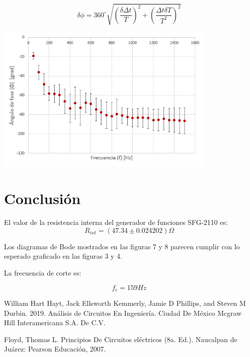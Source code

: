 \documentclass[DIV=calc, paper=a4, fontsize=11pt]{scrartcl}
\newenvironment{Figura}
  {\par\medskip\noindent\minipage{\linewidth}}
  {\endminipage\par\medskip}
\begin{document}
\begin{multicols}{2}
\begin{equation*}
     \delta \phi =360^{\circ} \sqrt{\left(\frac{\delta \Delta t}{T}\right)^2 + \left(\frac{\Delta t\delta T}{T^2}\right)^2}
\end{equation*}



\begin{Figura}
    \centering
    \includegraphics[width=0.8\textwidth]{grafica phi.PNG}
    \label{fig}
\end{Figura}











\section*{Conclusión}
El valor de la resistencia interna del generador de funciones SFG-2110 es:
$$R_{int}=(47.34\pm0.024202)\Omega$$

Los diagramas de Bode mostrados en las figuras 7 y 8 parecen cumplir con lo esperado graficado en las figuras 3 y 4.

La frecuencia de corte es:

\begin{equation*}
    f_c = 159 Hz
\end{equation*}


\begin{thebibliography}{99}

 William Hart Hayt, Jack Ellsworth Kemmerly, Jamie D Phillips, and Steven M Durbin. 2019. Análisis de Circuitos En Ingeniería. Ciudad De México Mcgraw Hill Interamericana S.A. De C.V.

 Floyd, Thomas L. Principios De Circuitos eléctricos (8a. Ed.). Naucalpan de Juárez: Pearson Educación, 2007. 

\end{thebibliography}

\end{multicols}
\end{document}
